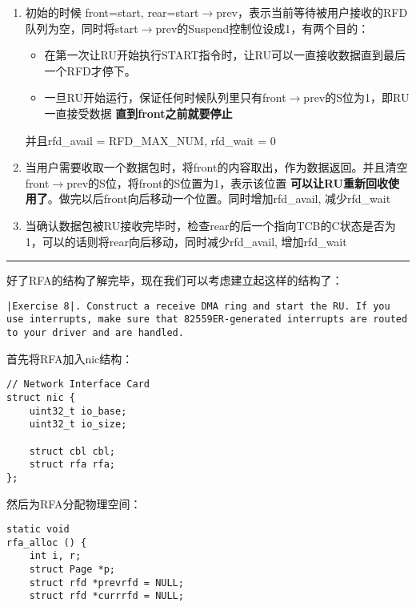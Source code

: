 \documentclass{article}
\newcommand{\highlight}[1]{{\bfseries \color{red}  #1}}
\begin{document}
\begin{CJK*}{UTF8}{gkai}
\begin{enumerate}
\item{初始的时候 front=start, rear=start$\rightarrow$prev，表示当前等待被用户接收的RFD队列为空，同时将start$\rightarrow$prev的Suspend控制位设成1，有两个目的：

\label{ruwork}

\begin{itemize}

\item{在第一次让RU开始执行START指令时，让RU可以一直接收数据直到最后一个RFD才停下。}
\item{一旦RU开始运行，保证任何时候队列里只有front$\rightarrow$prev的S位为1，即RU一直接受数据\highlight{直到front之前就要停止}}
\end{itemize}

并且rfd\_avail = RFD\_MAX\_NUM, rfd\_wait = 0}
\item{当用户需要收取一个数据包时，将front的内容取出，作为数据返回。并且清空front$\rightarrow$prev的S位，将front的S位置为1，表示该位置\highlight{可以让RU重新回收使用了}。做完以后front向后移动一个位置。同时增加rfd\_avail, 减少rfd\_wait}
\item{当确认数据包被RU接收完毕时，检查rear的后一个指向TCB的C状态是否为1，可以的话则将rear向后移动，同时减少rfd\_avail, 增加rfd\_wait}

\end{enumerate}


\vspace{2em}
\hrule
\vspace{2em}

好了RFA的结构了解完毕，现在我们可以考虑建立起这样的结构了：

\begin{lstlisting}[style=exercise]
|Exercise 8|. Construct a receive DMA ring and start the RU. If you use interrupts, make sure that 82559ER-generated interrupts are routed to your driver and are handled.
\end{lstlisting}

首先将RFA加入nic结构：

\begin{lstlisting}[style=ccode, title={\scriptsize \ttfamily \bfseries kern/e100.h}]
// Network Interface Card
struct nic {
    uint32_t io_base;
    uint32_t io_size;

    struct cbl cbl;
    struct rfa rfa;
};\end{lstlisting}

然后为RFA分配物理空间：


\begin{lstlisting}[style=ccode, title={\scriptsize \ttfamily \bfseries kern/e100.c: rfa\_alloc()}]
static void
rfa_alloc () {
    int i, r;
    struct Page *p;
    struct rfd *prevrfd = NULL;
    struct rfd *currrfd = NULL;


\end{lstlisting}
\end{CJK*}
\end{document}

